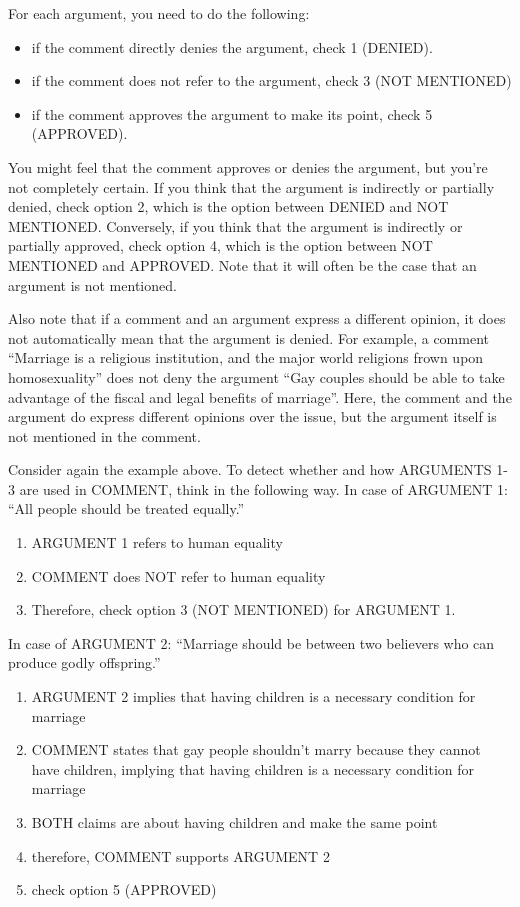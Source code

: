 \noindent For each argument, you need to do the following:
\begin{itemize}
\item if the comment directly denies the argument, check 1 (DENIED).
\item if the comment does not refer to the argument, check 3 (NOT MENTIONED)
\item if the comment approves the argument to make its point, check 5 (APPROVED).
\end{itemize}

\noindent You might feel that the comment approves or denies the argument, but you're not
completely certain. If you think that the argument is indirectly or partially
denied, check option 2, which is the option between DENIED and NOT MENTIONED.
Conversely, if you think that the argument is indirectly or partially approved,
check option 4, which is the option between NOT MENTIONED and APPROVED.
Note that it will often be the case that an argument is not mentioned.

Also note that if a comment and an argument express a different opinion, it
does not automatically mean that the argument is denied. For example, a comment
``Marriage is a religious institution, and the major world religions frown upon
homosexuality'' does not deny the argument ``Gay couples should be able to take
advantage of the fiscal and legal benefits of marriage''. Here, the comment and
the argument do express different opinions over the issue, but the argument
itself is not mentioned in the comment.

Consider again the example above. To detect whether and how ARGUMENTS 1-3 are
used in COMMENT, think in the following way.
In case of ARGUMENT 1: ``All people should be treated equally.''

\begin{enumerate}
\item    ARGUMENT 1 refers to human equality
\item    COMMENT does NOT refer to human equality
\item    Therefore, check option 3 (NOT MENTIONED) for ARGUMENT 1.
\end{enumerate}

\noindent In case of ARGUMENT 2: ``Marriage should be between two believers who can
produce godly offspring.''

\begin{enumerate}
\item ARGUMENT 2 implies that having children is a necessary condition for
marriage
\item COMMENT states that gay people shouldn’t marry because they cannot have
children, implying that having children is a necessary condition for marriage
\item BOTH claims are about having children and make the same point
\item therefore, COMMENT supports ARGUMENT 2
\item check option 5 (APPROVED)
\end{enumerate}

